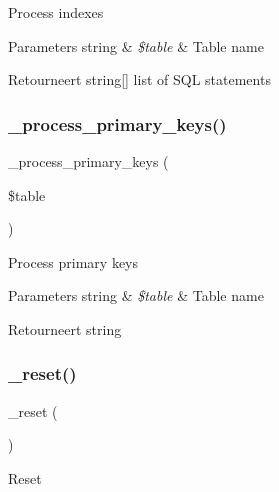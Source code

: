 Process indexes


\begin{DoxyParams}[1]{Parameters}
string & {\em \$table} & Table name \\
\hline
\end{DoxyParams}
\begin{DoxyReturn}{Retourneert}
string\mbox{[}\mbox{]} list of S\+QL statements 
\end{DoxyReturn}
\mbox{\label{class_c_i___d_b__forge_a207c32e2b5c14364b2e33d2f15500b7e}} 
\subsubsection{\texorpdfstring{\_process\_primary\_keys()}{\_process\_primary\_keys()}}
{\footnotesize\ttfamily \+\_\+process\+\_\+primary\+\_\+keys (\begin{DoxyParamCaption}\item[{}]{\$table }\end{DoxyParamCaption})\hspace{0.3cm}{\ttfamily [protected]}}

Process primary keys


\begin{DoxyParams}[1]{Parameters}
string & {\em \$table} & Table name \\
\hline
\end{DoxyParams}
\begin{DoxyReturn}{Retourneert}
string 
\end{DoxyReturn}
\mbox{\label{class_c_i___d_b__forge_ab90fa1f6f390913fed8670e6535dc180}} 
\subsubsection{\texorpdfstring{\_reset()}{\_reset()}}
{\footnotesize\ttfamily \+\_\+reset (\begin{DoxyParamCaption}{ }\end{DoxyParamCaption})\hspace{0.3cm}{\ttfamily [protected]}}

Reset

